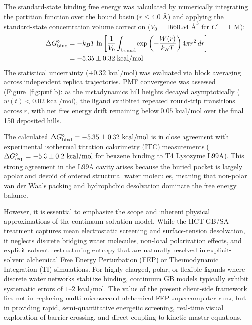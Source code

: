 \documentclass[journal=jpcbfk,manuscript=article]{achemso}
\begin{document}
The standard-state binding free energy was calculated by numerically integrating the partition function over the bound basin ($r \le 4.0\text{ \AA}$) and applying the standard-state concentration volume correction ($V_0 = 1660.54\text{ \AA}^3$ for $C^\circ = 1\text{ M}$):
\begin{align}
\Delta G^\circ_{\rm bind} &= -k_B T \ln \left[ \frac{1}{V_0} \int_{\rm bound} \exp\left(-\frac{W(r)}{k_B T}\right) 4\pi r^2\,dr \right] \nonumber \\
&= -5.35 \pm 0.32\text{ kcal/mol}
\end{align}
The statistical uncertainty ($\pm 0.32\text{ kcal/mol}$) was evaluated via block averaging across independent replica trajectories. PMF convergence was assessed (Figure~\ref{fig:pmf}b): as the metadynamics hill heights decayed asymptotically ($w(t) < 0.02\text{ kcal/mol}$), the ligand exhibited repeated round-trip transitions across $r$, with net free energy drift remaining below $0.05\text{ kcal/mol}$ over the final 150 deposited hills.

The calculated $\Delta G^\circ_{\rm bind} = -5.35 \pm 0.32\text{ kcal/mol}$ is in close agreement with experimental isothermal titration calorimetry (ITC) measurements ($\Delta G^\circ_{\rm exp} = -5.3 \pm 0.2\text{ kcal/mol}$ for benzene binding to T4 Lysozyme L99A\cite{morton1995energetic,mobley2007predicting}). This strong agreement in the L99A cavity arises because the buried pocket is largely apolar and devoid of ordered structural water molecules, meaning that non-polar van der Waals packing and hydrophobic desolvation dominate the free energy balance. 

However, it is essential to emphasize the scope and inherent physical approximations of the continuum solvation model. While the HCT-GB/SA treatment captures mean electrostatic screening and surface-tension desolvation, it neglects discrete bridging water molecules, non-local polarization effects, and explicit solvent restructuring entropy that are naturally resolved in explicit-solvent alchemical Free Energy Perturbation (FEP) or Thermodynamic Integration (TI) simulations.\cite{boresch2003absolute,mobley2017predicting} For highly charged, polar, or flexible ligands where discrete water networks stabilize binding, continuum GB models typically exhibit systematic errors of $1\text{--}2\text{ kcal/mol}$. The value of the present client-side framework lies not in replacing multi-microsecond alchemical FEP supercomputer runs, but in providing rapid, semi-quantitative energetic screening, real-time visual exploration of barrier crossing, and direct coupling to kinetic master equations.
\end{document}
